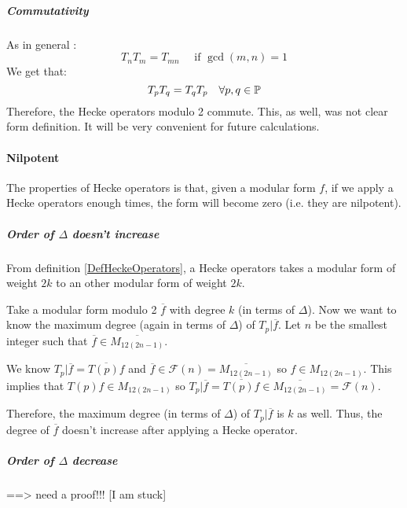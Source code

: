 \subparagraph{Commutativity}
As in general \cite[p.101]{CourseInArithmetic}:
$$
T_nT_m = T_{mn} \quad \text{ if } \gcd(m,n)=1
$$
We get that:
$$
T_pT_q=T_qT_p \quad \forall p,q \in \mathbb{P}
$$
Therefore, the Hecke operators modulo 2 commute.
This, as well, was not clear form definition.
It will be very convenient for future calculations.

\paragraph{Nilpotent}
The properties of Hecke operators is that, given a modular form $f$, if we apply a Hecke operators enough times, the form will become zero (i.e. they are nilpotent).

\subparagraph{Order of $\Delta$ doesn't increase}
From definition \ref{DefHeckeOperators}, a Hecke operators takes a modular form of weight $2k$ to an other modular form of weight $2k$.

Take a modular form modulo 2 $\overline{f}$ with degree $k$ (in terms of $\Delta$).
Now we want to know the maximum degree (again in terms of $\Delta$) of $T_p|\overline{f}$.
Let $n$ be the smallest integer such that $\overline{f} \in \overline{M_{12(2n-1)}}$.

We know $T_p|\overline{f} = \overline{T(p)f}$ and $\overline{f} \in \mathcal{F}(n) = \overline{M_{12(2n-1)}}$ so $f \in M_{12(2n-1)}$.
This implies that $T(p)f \in M_{12(2n-1)}$ so $T_p|\overline{f} = \overline{T(p)f} \in \overline{M_{12(2n-1)}} = \mathcal{F}(n)$.

Therefore, the maximum degree (in terms of $\Delta$) of $T_p|\overline{f}$ is $k$ as well.
Thus, the degree of $\overline{f}$ doesn't increase after applying a Hecke operator.

\subparagraph{Order of $\Delta$ decrease}
\cite[2.3]{OrdreNilpotenceOperateurHecke}
==> need a proof!!!
[I am stuck]

